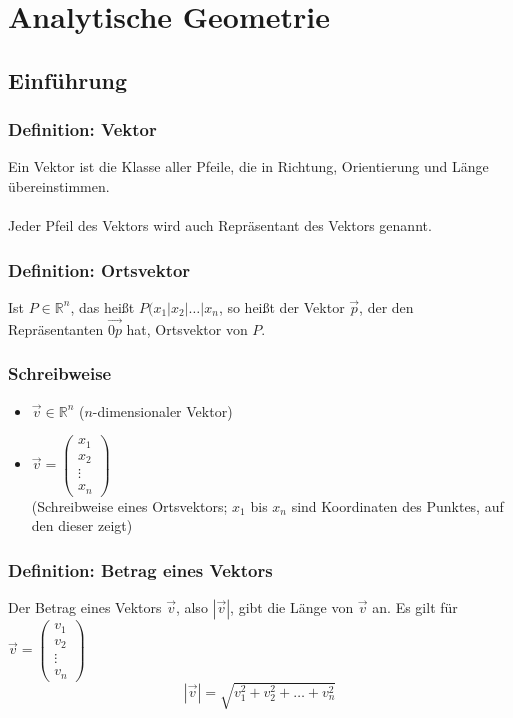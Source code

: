 \documentclass{article}
\begin{document}
  \section{Analytische Geometrie}
  
  \subsection{Einführung}
  
  \subsubsection{Definition: Vektor}
  Ein Vektor ist die Klasse aller Pfeile, die in Richtung, Orientierung und Länge übereinstimmen. \\
  \\
  Jeder Pfeil des Vektors wird auch Repräsentant des Vektors genannt.
  
  \subsubsection{Definition: Ortsvektor}
  Ist $P \in \mathbb{R}^n$, das heißt $P(x_1 | x_2 | \ldots | x_n$, so heißt der Vektor $\vec{p}$, der den Repräsentanten $\vec{0p}$ hat, Ortsvektor von $P$. 
  
  \subsubsection{Schreibweise}
  \begin{itemize}
  	\item $\vec{v} \in \mathbb{R}^n$ ($n$-dimensionaler Vektor) \\
  	\item $\vec{v} = 
  	\begin{pmatrix}
  		x_1 \\
  		x_2 \\
  		\vdots \\
  		x_n
  	\end{pmatrix}$ \\
  	(Schreibweise eines Ortsvektors; $x_1$ bis $x_n$ sind Koordinaten des Punktes, auf den dieser zeigt)
  \end{itemize}
  
  \subsubsection{Definition: Betrag eines Vektors}
  Der Betrag eines Vektors $\vec{v}$, also $|\vec{v}|$, gibt die Länge von $\vec{v}$ an. Es gilt für $\vec{v} = 
  \begin{pmatrix}
  	v_1 \\
  	v_2 \\
  	\vdots \\
  	v_n
  \end{pmatrix}$
  \begin{equation*}
  	| \vec{v} | = \sqrt{v_1^2 + v_2^2 + \ldots + v_n^2}
  \end{equation*}
  
\end{document}
